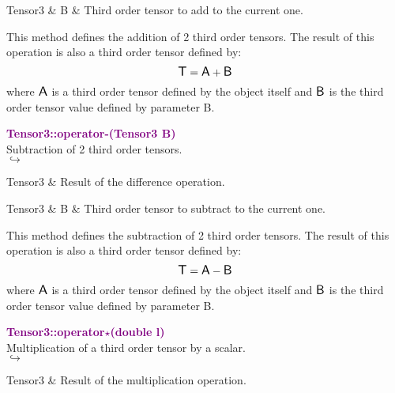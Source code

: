 \begin{tcolorbox}[width=\textwidth,myArgs,tabularx={ll|R}]
Tensor3 & B & Third order tensor to add to the current one.
\end{tcolorbox}

This method defines the addition of 2 third order tensors.
The result of this operation is also a third order tensor defined by:
\begin{equation*}
\mbox{\large\ensuremath{\mathsf{T}}} = \mbox{\large\ensuremath{\mathsf{A}}} + \mbox{\large\ensuremath{\mathsf{B}}}
\end{equation*}
where $\mbox{\large\ensuremath{\mathsf{A}}}$ is a third order tensor defined by the object itself and $\mbox{\large\ensuremath{\mathsf{B}}}$ is the third order tensor value defined by parameter B.

\textcolor{purple}{\textbf{Tensor3::operator-(Tensor3 B)}}\label{Tensor3::operator-(Tensor3 B)}\\
Subtraction of 2 third order tensors.\\ \hspace*{5mm}$\hookrightarrow$
\vspace*{-2em}\begin{tcolorbox}[grow to left by=-1cm, width=\textwidth-1cm,myArgs,tabularx={l|R}]
Tensor3 & Result of the difference operation.
\end{tcolorbox}

\begin{tcolorbox}[width=\textwidth,myArgs,tabularx={ll|R}]
Tensor3 & B & Third order tensor to subtract to the current one.
\end{tcolorbox}

This method defines the subtraction of 2 third order tensors.
The result of this operation is also a third order tensor defined by:
\begin{equation*}
\mbox{\large\ensuremath{\mathsf{T}}} = \mbox{\large\ensuremath{\mathsf{A}}} - \mbox{\large\ensuremath{\mathsf{B}}}
\end{equation*}
where $\mbox{\large\ensuremath{\mathsf{A}}}$ is a third order tensor defined by the object itself and $\mbox{\large\ensuremath{\mathsf{B}}}$ is the third order tensor value defined by parameter B.

\textcolor{purple}{\textbf{Tensor3::operator$\star$(double l)}}\label{Tensor3::operator*(double l)}\\
Multiplication of a third order tensor by a scalar.\\ \hspace*{5mm}$\hookrightarrow$
\vspace*{-2em}\begin{tcolorbox}[grow to left by=-1cm, width=\textwidth-1cm,myArgs,tabularx={l|R}]
Tensor3 & Result of the multiplication operation.
\end{tcolorbox}

